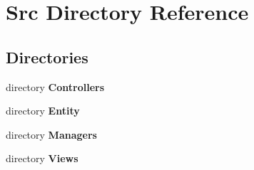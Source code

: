 \section{Src Directory Reference}
\label{dir_413f4e031a85da0d68269c6fd2f76e1c}
\subsection*{Directories}
\begin{DoxyCompactItemize}
\item 
directory \textbf{ Controllers}
\item 
directory \textbf{ Entity}
\item 
directory \textbf{ Managers}
\item 
directory \textbf{ Views}
\end{DoxyCompactItemize}
